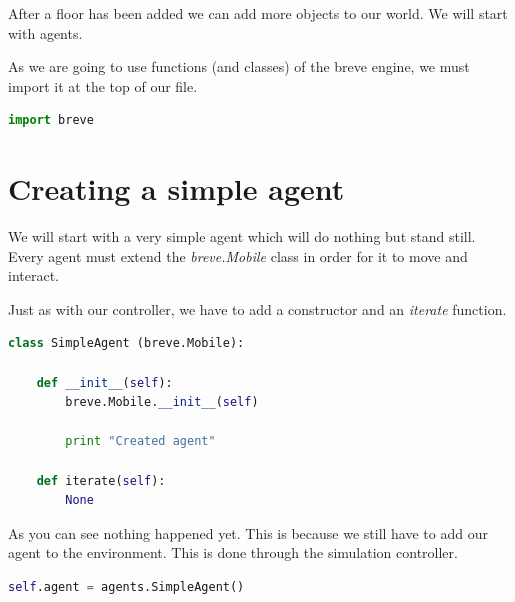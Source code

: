 After a floor has been added we can add more objects to our world. We will start with agents.


As we are going to use functions (and classes) of the breve engine, we must import it at the top of our file.

\begin{lstlisting}[language=Python]
import breve
\end{lstlisting}


\section{Creating a simple agent}

We will start with a very simple agent which will do nothing but stand still. Every agent must extend the \textit{breve.Mobile} class in order for it to move and interact.

Just as with our controller, we have to add a constructor and an \textit{iterate} function.

\begin{lstlisting}[language=Python]
class SimpleAgent (breve.Mobile):

	def __init__(self):
		breve.Mobile.__init__(self)

		print "Created agent"

	def iterate(self):
		None
\end{lstlisting}



As you can see nothing happened yet. This is because we still have to add our agent to the environment. This is done through the simulation controller.

\begin{lstlisting}[language=Python]
self.agent = agents.SimpleAgent()
\end{lstlisting}



